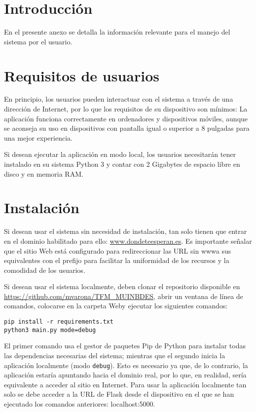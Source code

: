 
\section{Introducción}

En el presente anexo se detalla la información relevante para el manejo del sistema por el usuario.

\section{Requisitos de usuarios}

En principio, los usuarios pueden interactuar con el sistema a través de una dirección de Internet, por lo que los requisitos de su dispositivo son mínimos: La aplicación funciona correctamente en ordenadores y dispositivos móviles, aunque se aconseja su uso en dispositivos con pantalla igual o superior a 8 pulgadas para una mejor experiencia.

Si desean ejecutar la aplicación en modo local, los usuarios necesitarán tener instalado en su sistema Python 3 y contar con 2 Gigabytes de espacio libre en disco y en memoria RAM.

\section{Instalación}

Si desean usar el sistema sin necesidad de instalación, tan solo tienen que entrar en el dominio habilitado para ello: \url{www.dondeteesperan.es}. Es importante señalar que el sitio Web está configurado para redireccionar las URL sin \guillemotleft www\guillemotright\space a sus equivalentes con el prefijo para facilitar la uniformidad de los recursos y la comodidad de los usuarios.

Si desean usar el sistema localmente, deben clonar el repositorio disponible en \url{https://github.com/mvarona/TFM\_MUINBDES}, abrir un ventana de línea de comandos, colocarse en la carpeta \guillemotleft Web\guillemotright\space y ejecutar los siguientes comandos:

\begin{verbatim}
pip install -r requirements.txt
python3 main.py mode=debug
\end{verbatim}

El primer comando usa el gestor de paquetes Pip de Python para instalar todas las dependencias necesarias del sistema; mientras que el segundo inicia la aplicación localmente (modo \texttt{debug}). Esto es necesario ya que, de lo contrario, la aplicación estaría apuntando hacia el dominio real, por lo que, en realidad, sería equivalente a acceder al sitio en Internet. Para usar la aplicación localmente tan solo se debe acceder a la URL de Flask desde el dispositivo en el que se han ejecutado los comandos anteriores: localhost:5000.

